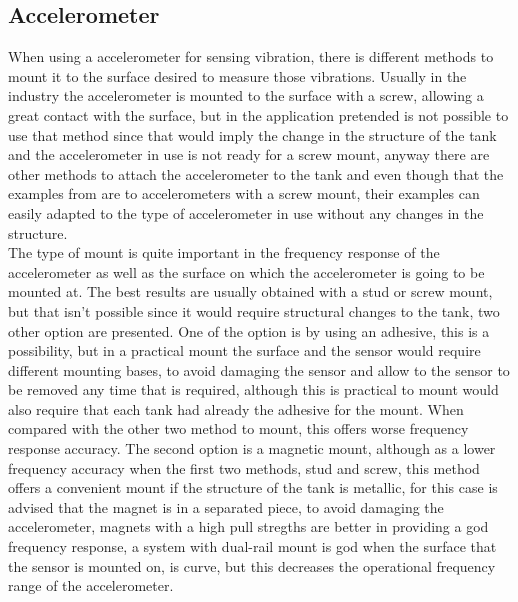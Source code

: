 \subsection{Accelerometer}
When using a accelerometer for sensing vibration, there is different methods to mount it to the surface desired to measure those vibrations. Usually in the industry the accelerometer is mounted to the surface with a screw, allowing a great contact with the surface, but in the application pretended is not possible to use that method since that would imply the change in the structure of the tank and the accelerometer in use is not ready for a screw mount, anyway there are other methods to attach the accelerometer to the tank and even though that the examples from \cite{GuidelinesMountingTest} are to accelerometers with a screw mount, their examples can easily adapted to the type of accelerometer in use without any changes in the structure.\\
The type of mount is quite important in the frequency response of the accelerometer as well as the surface on which the accelerometer is going to be mounted at. The best results are usually obtained with a stud or screw mount, but that isn't possible since it would require structural changes to the tank, two other option are presented. One of the option is by using an adhesive, this is a possibility, but in a practical mount the surface and the sensor would require different mounting bases, to avoid damaging the sensor and allow to the sensor to be removed any time that is required, although this is practical to mount would also require that each tank had already the adhesive for the mount. When compared with the other two method to mount, this offers worse frequency response accuracy. The second option is a magnetic mount, although as a lower frequency accuracy when the first two methods, stud and screw, this method offers a convenient mount if the structure of the tank is metallic, for this case is advised that the magnet is in a separated piece, to avoid damaging the accelerometer, magnets with a high pull stregths are better in providing a god frequency response, a system with dual-rail mount is god when the surface that the sensor is mounted on, is curve, but this decreases the operational frequency range of the accelerometer.\\


